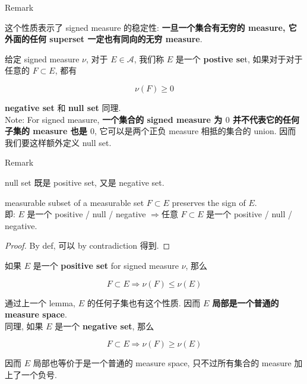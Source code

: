 \begin{qlremark}{Remark}

这个性质表示了 signed measure 的稳定性: \textbf{一旦一个集合有无穷的 measure, 它外面的任何 superset 一定也有同向的无穷 measure}.

\end{qlremark}

\begin{definition}{}

给定 signed measure \(\nu\), 对于 \(E \in \mathcal{A}\), 我们称 \(E\) 是一个 \textbf{postive se}t, 如果对于对于任意的 \(F \subset E\), 都有

\[\nu(F) \geq 0\]

\textbf{negative set} 和 \textbf{null set} 同理.\\
Note: For signed measure, \textbf{一个集合的 signed measure 为 \(0\) 并不代表它的任何子集的 measure 也是 \(0\)}, 它可以是两个正负 measure 相抵的集合的 union. 因而我们要这样额外定义 null set.

\end{definition}

\begin{qlremark}{Remark}

null set 既是 positive set, 又是 negative set.

\end{qlremark}

\begin{lemma}{}

measurable subset of a measurable set \(F \subset E\) preserves the sign of \(E\).\\
即: \(E\) 是一个 positive / null / negative \(\Longrightarrow\)任意 \(F \subset E\) 是一个 positive / null / negative.

\end{lemma}

\begin{proof}

By def, 可以 by contradiction 得到.

\end{proof}

\begin{lemma}{}

如果 \(E\) 是一个 \textbf{positive set} for signed measure \(\nu\), 那么

\[F \subset E\Longrightarrow\nu(F) \leq \nu(E)\]

通过上一个 lemma, \(E\) 的任何子集也有这个性质. 因而 \textbf{\(E\) 局部是一个普通的 measure space}.\\
同理, 如果 \(E\) 是一个 \textbf{negative set}, 那么

\[F \subset E\Longrightarrow\nu(F) \geq \nu(E)\]

因而 \(E\) 局部也等价于是一个普通的 measure space, 只不过所有集合的 measure 加上了一个负号.

\end{lemma}

